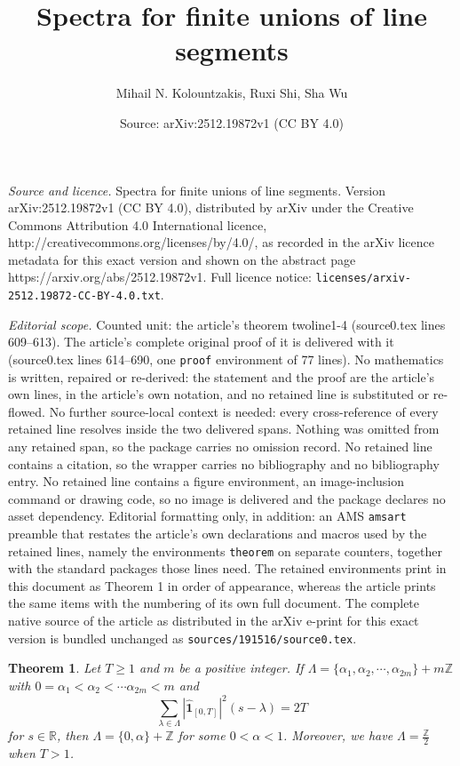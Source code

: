 \documentclass[10pt,a4paper]{amsart}
\title{Spectra for finite unions of line segments}
\author{Mihail N. Kolountzakis, Ruxi Shi, Sha Wu}
\date{Source: arXiv:2512.19872v1 (CC BY 4.0)}
\newtheorem{theorem}{Theorem}
\begin{document}
\maketitle

\noindent\emph{Source and licence.} Spectra for finite unions of line segments. Version arXiv:2512.19872v1 (CC BY 4.0), distributed by arXiv under the Creative Commons Attribution 4.0 International licence, http://creativecommons.org/licenses/by/4.0/, as recorded in the arXiv licence metadata for this exact version and shown on the abstract page https://arxiv.org/abs/2512.19872v1. Full licence notice: \texttt{licenses/arxiv-2512.19872-CC-BY-4.0.txt}.\par\smallskip

\noindent\textit{Editorial scope.} Counted unit: the article's theorem twoline1-4 (source0.tex lines 609--613). The article's complete original proof of it is delivered with it (source0.tex lines 614--690, one \texttt{proof} environment of 77 lines). No mathematics is written, repaired or re-derived: the statement and the proof are the article's own lines, in the article's own notation, and no retained line is substituted or re-flowed.  No further source-local context is needed: every cross-reference of every retained line resolves inside the two delivered spans.  Nothing was omitted from any retained span, so the package carries no omission record.  No retained line contains a citation, so the wrapper carries no bibliography and no bibliography entry.  No retained line contains a figure environment, an image-inclusion command or drawing code, so no image is delivered and the package declares no asset dependency.  Editorial formatting only, in addition: an AMS \texttt{amsart} preamble that restates the article's own declarations and macros used by the retained lines, namely the environments \texttt{theorem} on separate counters, together with the standard packages those lines need.  The retained environments print in this document as Theorem 1 in order of appearance, whereas the article prints the same items with the numbering of its own full document.  The complete native source of the article as distributed in the arXiv e-print for this exact version is bundled unchanged as \texttt{sources/191516/source0.tex}.
\begin{theorem}\label{twoline1-4}
 Let $T\geq1$ and $m$ be a positive integer. If   $\Lambda =\{\alpha_1, \alpha_2, \cdots ,\alpha_{2m}\}+m\mathbb{Z}$
with   $0=\alpha_1< \alpha_2< \cdots \alpha_{2m}<m $ and  $$
\sum_{\lambda  \in \Lambda }\left|\hat{ \mathbf{1}}_{\left[0, T \right]}\right|^2\left(s-\lambda\right) = 2T $$ for   $s \in \mathbb{R}$, then $ \Lambda=\{0, \alpha\}+\mathbb{Z}$  for some $0<\alpha<1$. Moreover,  we have  $ \Lambda=   \frac{\mathbb{Z}}{2}$ when $T>1$. 
\end{theorem}
\end{document}
